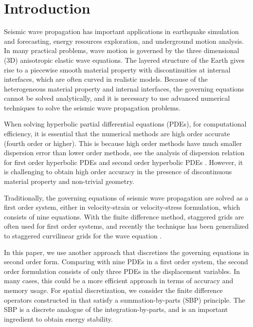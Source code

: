 \section{Introduction}
Seismic wave propagation has important applications in earthquake simulation and forecasting, energy resources exploration, and underground motion analysis. In many practical problems, wave motion is governed by the three dimensional (3D) anisotropic elastic wave equations. The layered structure of the Earth gives rise to a piecewise smooth material property with discontinuities at internal interfaces, which are often curved in realistic models. Because of the heterogeneous material property and internal interfaces, the governing equations cannot be solved analytically, and it is necessary to use advanced numerical techniques to solve the seismic wave propagation problems.

When solving hyperbolic partial differential equations (PDEs), for computational efficiency, it is essential that the numerical methods are high order accurate (fourth order or higher). This is because high order methods have much smaller dispersion error than lower order methods, see the analysis of dispersion relation for first order hyperbolic PDEs \cite{Kreiss1972} and second order hyperbolic PDEs \cite{Hagstrom2012}. However, it is challenging to obtain high order accuracy in the presence of discontinuous material property and non-trivial geometry. 

Traditionally, the governing equations of seismic wave propagation are solved as a first order system, either in velocity-strain or velocity-stress formulation, which consists of nine equations. With the finite difference method, staggered grids are often used for first order systems, and recently the technique has been generalized to staggered curvilinear grids for the wave equation \cite{OReilly2020}.

In this paper, we use another approach that discretizes the governing equations in second order form. Comparing with nine PDEs in a first order system, the second order formulation consists of only three PDEs in the displacement variables. In many cases, this could be a more efficient approach in terms of accuracy and memory usage. For spatial discretization, we consider the finite difference operators constructed in \cite{sjogreen2012fourth} that satisfy a summation-by-parts (SBP) principle. The SBP is a discrete analogue of the integration-by-parts, and is an important ingredient to obtain energy stability. 

